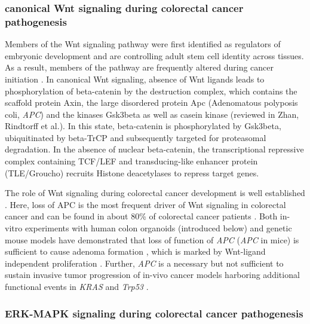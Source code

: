 \begin{flushleft}
\subsubsection{canonical Wnt signaling during colorectal cancer pathogenesis}

Members of the Wnt signaling pathway were first identified as regulators of embryonic development \citep{sharmaEffectWinglessWg11976, nusslein-volhardMutationsAffectingSegment1980} and are controlling adult stem cell identity across tissues. As a result, members of the pathway are frequently altered during cancer initiation \citep{zhanWntSignalingCancer2017}. In canonical Wnt signaling, absence of Wnt ligands leads to phosphorylation of beta-catenin by the destruction complex, which contains the scaffold protein Axin, the large disordered protein Apc (Adenomatous polyposis coli, \textit{APC}) and the kinases Gsk3beta as well as casein kinase (reviewed in Zhan, Rindtorff et al.\citep{zhanWntSignalingCancer2017}). 
In this state, beta-catenin is phosphorylated by Gsk3beta, ubiquitinated by beta-TrCP and subsequently targeted for proteasomal degradation. In the absence of nuclear beta-catenin, the transcriptional repressive complex containing TCF/LEF and transducing-like enhancer protein (TLE/Groucho) recruits Histone deacetylases to repress target genes. \par 

The role of Wnt signaling during colorectal cancer development is well established \citep{polakisManyWaysWnt2007}. Here, loss of APC is the most frequent driver of Wnt signaling in colorectal cancer and can be found in about 80\% of colorectal cancer patients \citep{fearonMolecularGeneticsColorectal2011, zhanWntSignalingCancer2017}. Both in-vitro experiments with human colon organoids (introduced below) and genetic mouse models have demonstrated that loss of function of \textit{APC} (\textit{APC} in mice) is sufficient to cause adenoma formation \citep{moserApcMinMouseModel1995}, which is marked by Wnt-ligand independent proliferation \citep{matanoModelingColorectalCancer2015a, drostSequentialCancerMutations2015}. Further, \textit{APC} is a necessary but not sufficient to sustain invasive tumor progression of in-vivo cancer models harboring additional functional events in \textit{KRAS} and \textit{Trp53} \citep{dowApcRestorationPromotes2015a, sakaiCombinedMutationApc2018a}.
\par

\subsubsection{ERK-MAPK signaling during colorectal cancer pathogenesis}


\end{flushleft}
